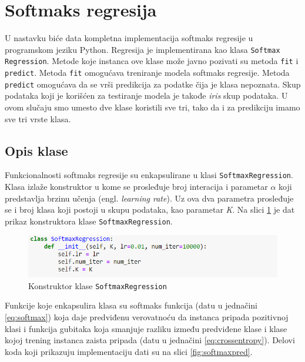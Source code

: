 \documentclass[a4paper,12pt]{report}
\begin{document}
\section{Softmaks regresija}

U nastavku biće data kompletna implementacija softmaks regresije u programskom jeziku Python. Regresija je implementirana kao klasa \texttt{Softmax Regression}. Metode koje instanca ove klase može javno pozivati su metoda \texttt{fit} i \texttt{predict}. Metoda \texttt{fit} omogućava treniranje modela softmaks regresije. Metoda \texttt{predict} omogućava da se vrši predikcija za podatke čija je klasa nepoznata. Skup podataka koji je korišćen za testiranje modela je takođe \textit{iris} skup podataka. U ovom slučaju smo umesto dve klase koristili sve tri, tako da i za predikciju imamo sve tri vrste klasa.

\subsection{Opis klase}

Funkcionalnosti softmaks regresije su enkapsulirane u klasi \texttt{SoftmaxRegression}. Klasa izlaže konstruktor u kome se prosleđuje broj interacija i parametar $\alpha$ koji predstavlja brzinu učenja (engl. \textit{learning rate}). Uz ova dva parametra prosleđuje se i broj klasa koji postoji u skupu podataka, kao parametar \textit{K}. Na slici \ref{fig:softmaxconst} je dat prikaz konstruktora klase \texttt{SoftmaxRegression}.

\begin{figure}[h]
    \centering
    \includegraphics[width=\textwidth]{softmax_constructor.png}
    \caption{Konstruktor klase \texttt{SoftmaxRegression}}\label{fig:softmaxconst}
\end{figure}

Funkcije koje enkapsulira klasa su softmaks funkcija (datu u jednačini \ref{eq:softmax}) koja daje predviđenu verovatnoću da instanca pripada pozitivnoj klasi i funkcija gubitaka koja smanjuje razliku između predviđene klase i klase kojoj trening instanca zaista pripada (datu u jednačini \ref{eq:crossentropy}). Delovi koda koji prikazuju implementaciju dati su na slici \ref{fig:softmaxpred}.
\end{document}
